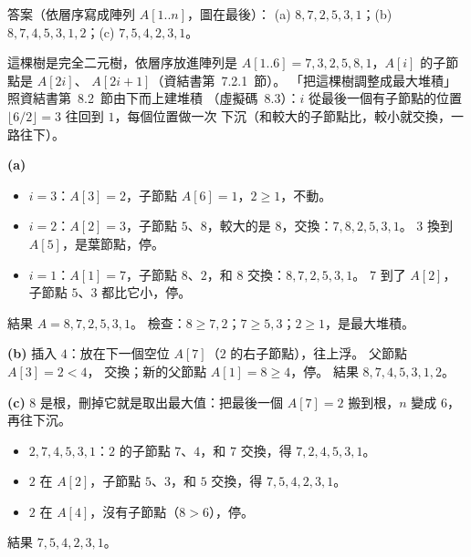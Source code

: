 \begin{pastsoln}
答案（依層序寫成陣列 $A[1..n]$，圖在最後）：
(a) $8, 7, 2, 5, 3, 1$；(b) $8, 7, 4, 5, 3, 1, 2$；(c) $7, 5, 4, 2, 3, 1$。

這棵樹是完全二元樹，依層序放進陣列是 $A[1..6] = 7, 3, 2, 5, 8, 1$，$A[i]$ 的子節點是 $A[2i]$、
$A[2i+1]$（資結書第~7.2.1~節）。 「把這棵樹調整成最大堆積」照資結書第~8.2~節由下而上建堆積
（虛擬碼~8.3）：$i$ 從最後一個有子節點的位置 $\lfloor 6/2 \rfloor = 3$ 往回到 $1$，每個位置做一次
下沉（和較大的子節點比，較小就交換，一路往下）。

\textbf{(a)}
\begin{itemize}
\item $i = 3$：$A[3] = 2$，子節點 $A[6] = 1$，$2 \ge 1$，不動。
\item $i = 2$：$A[2] = 3$，子節點 $5$、$8$，較大的是 $8$，交換：$7, 8, 2, 5, 3, 1$。 $3$ 換到
$A[5]$，是葉節點，停。
\item $i = 1$：$A[1] = 7$，子節點 $8$、$2$，和 $8$ 交換：$8, 7, 2, 5, 3, 1$。 $7$ 到了 $A[2]$，
子節點 $5$、$3$ 都比它小，停。
\end{itemize}
結果 $A = 8, 7, 2, 5, 3, 1$。 檢查：$8 \ge 7, 2$；$7 \ge 5, 3$；$2 \ge 1$，是最大堆積。

\textbf{(b)} 插入 $4$：放在下一個空位 $A[7]$（$2$ 的右子節點），往上浮。 父節點 $A[3] = 2 < 4$，
交換；新的父節點 $A[1] = 8 \ge 4$，停。 結果 $8, 7, 4, 5, 3, 1, 2$。

\textbf{(c)} $8$ 是根，刪掉它就是取出最大值：把最後一個 $A[7] = 2$ 搬到根，$n$ 變成 $6$，再往下沉。
\begin{itemize}
\item $2, 7, 4, 5, 3, 1$：$2$ 的子節點 $7$、$4$，和 $7$ 交換，得 $7, 2, 4, 5, 3, 1$。
\item $2$ 在 $A[2]$，子節點 $5$、$3$，和 $5$ 交換，得 $7, 5, 4, 2, 3, 1$。
\item $2$ 在 $A[4]$，沒有子節點（$8 > 6$），停。
\end{itemize}
結果 $7, 5, 4, 2, 3, 1$。

\begin{center}
\end{center}


\end{pastsoln}

